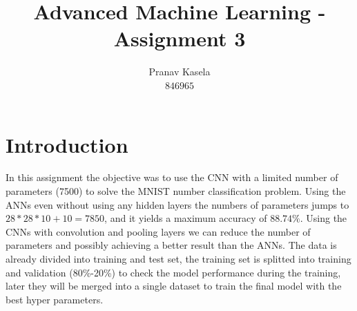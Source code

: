 \documentclass[11pt]{article}
\title{Advanced Machine Learning - Assignment 3}
\author{Pranav Kasela \\$846965$}
\date{}
\begin{document}
\maketitle

\section*{Introduction}
In this assignment the objective was to use the CNN with a limited number of parameters (7500) to solve the MNIST number classification problem. Using the ANNs even without using any hidden layers the numbers of parameters jumps to $28*28*10 + 10 = 7850$, and it yields a maximum accuracy of $88.74\%$. Using the CNNs with convolution and pooling layers we can reduce the number of parameters and possibly achieving a better result than the ANNs. The data is already divided into training and test set, the training set is splitted into training and validation (80\%-20\%) to check the model performance during the training, later they will be merged into a single dataset to train the final model with the best hyper parameters.
\end{document}
